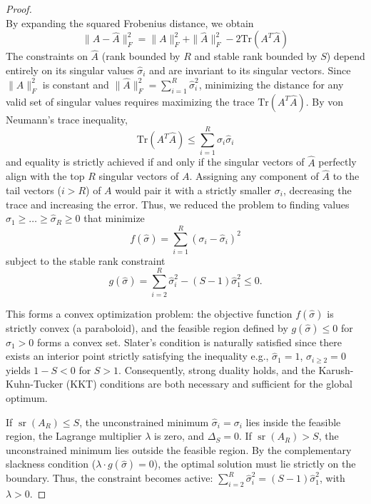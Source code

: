 \documentclass[a4paper,14pt]{extarticle}
\DeclareMathOperator{\sr}{sr}
\begin{document}
    \begin{proof} $~~$\\
        By expanding the squared Frobenius distance, we obtain 
        $$\|A - \hat{A}\|_F^2 = \|A\|_F^2 + \|\hat{A}\|_F^2 - 2\text{Tr}(A^T \hat{A})$$
        The constraints on $\hat{A}$ (rank bounded by $R$ and stable rank bounded by $S$) depend entirely on its singular values $\hat{\sigma}_i$ and are invariant to its singular vectors. Since $\|A\|_F^2$ is constant and $\|\hat{A}\|_F^2 = \sum_{i=1}^R \hat{\sigma}_i^2$, minimizing the distance for any valid set of singular values requires maximizing the trace $\text{Tr}(A^T \hat{A})$. 
        By von Neumann's trace inequality,
        $$\text{Tr}(A^T \hat{A}) \leqslant \sum_{i=1}^R \sigma_i \hat{\sigma}_i$$
        and equality is strictly achieved if and only if the singular vectors of $\hat{A}$ perfectly align with the top $R$ singular vectors of $A$. Assigning any component of $\hat{A}$ to the tail vectors ($i > R$) of $A$ would pair it with a strictly smaller $\sigma_i$, decreasing the trace and increasing the error. Thus, we reduced the problem to finding values $\hat{\sigma}_1 \geqslant \dots \geqslant \hat{\sigma}_R \geqslant 0$ that minimize 
            $$f(\hat{\sigma}) = \sum_{i=1}^R (\sigma_i - \hat{\sigma}_i)^2$$ 
        subject to the stable rank constraint 
            $$g(\hat{\sigma}) = \sum_{i=2}^R \hat{\sigma}_i^2 - (S-1)\hat{\sigma}_1^2 \leqslant 0.$$

        This forms a convex optimization problem: the objective function $f(\hat{\sigma})$ is strictly convex (a paraboloid), and the feasible region defined by $g(\hat{\sigma}) \leqslant 0$ for $\hat{\sigma}_1 > 0$ forms a convex set. Slater's condition is naturally satisfied since there exists an interior point strictly satisfying the inequality e.g., $\hat{\sigma}_1 = 1$, $\hat{\sigma}_{i \geqslant 2} = 0$ yields $1-S < 0$ for $S>1$. Consequently, strong duality holds, and the Karush-Kuhn-Tucker (KKT) conditions are both necessary and sufficient for the global optimum.

        If $\sr(A_R) \leqslant S$, the unconstrained minimum $\hat{\sigma}_i = \sigma_i$ lies inside the feasible region, the Lagrange multiplier $\lambda$ is zero, and $\Delta_S = 0$.
        If $\sr(A_R) > S$, the unconstrained minimum lies outside the feasible region. By the complementary slackness condition ($\lambda \cdot g(\hat{\sigma}) = 0$), the optimal solution must lie strictly on the boundary. Thus, the constraint becomes active: $\sum_{i=2}^R \hat{\sigma}_i^2 = (S - 1)\hat{\sigma}_1^2$, with $\lambda > 0$.


\end{proof}
\end{document}
